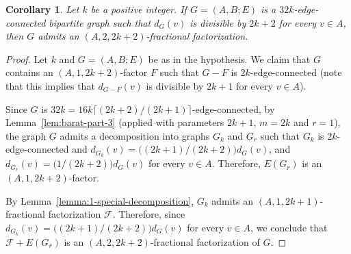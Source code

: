 \documentclass[12pt,reqno,a4paper]{amsart}
\newtheorem{corollary}[theorem]{Corollary}
\begin{document}

\begin{corollary}\label{corollary:even-special-decomposition}
Let \(k\) be a positive integer.
If $G=(A,B;E)$ is a $32k$-edge-connected bipartite 
graph such 
that $d_G(v)$ is divisible by $2k+2$ for every 
$v\in A$, then $G$ admits an \((A,2,2k+2)\)-fractional factorization.	
\end{corollary}

\begin{proof}
Let \(k\) and \(G=(A,B;E)\) be as in the hypothesis.
We claim that \(G\) contains an \((A,1,2k+2)\)-factor \(F\) such that
\(G-F\) is \(2k\)-edge-connected (note that this implies that $d_{G-F}(v)$ is 
divisible by $2k+1$ for every $v\in A$).


Since $G$ is $32k=16k\lceil(2k+2)/(2k+1)\rceil$-edge-connected, 
by Lemma~\ref{lem:barat-part-3} (applied with parameters $2k+1$, $m=2k$ and $r=1$), 
the graph $G$ admits a 
decomposition into graphs \(G_k\) and \(G_r\) such that \(G_k\) is 
\(2k\)-edge-connected and \(d_{G_k}(v) = 
\big((2k+1)/(2k+2)\big)d_G(v)\), and \(d_{G_r}(v) = \big(1/(2k+2)\big)d_G(v)\) 
for every \(v\in A\).
Therefore, \(E(G_r)\) is an \((A,1,2k+2)\)-factor.

By Lemma~\ref{lemma:1-special-decomposition}, \(G_k\) admits an 
\((A,1,2k+1)\)-fractional factorization 
\(\mathcal{F}\). Therefore, since \(d_{G_k}(v) = 
\big((2k+1)/(2k+2)\big)d_G(v)\) for every $v\in A$, we conclude that 
\(\mathcal{F} + E(G_r)\) is an 
\((A,2,2k+2)\)-fractional factorization of \(G\).

\end{proof}
\end{document}
